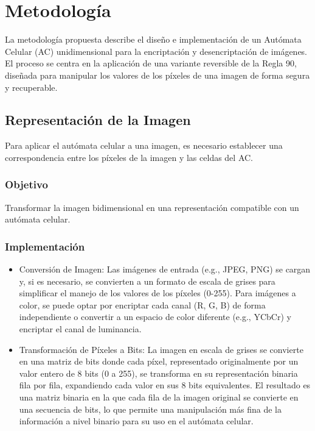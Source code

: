 \chapter{Metodología}
La metodología propuesta describe el diseño e implementación de un Autómata Celular (AC) unidimensional para la encriptación y desencriptación de imágenes. El proceso se centra en la aplicación de una variante reversible de la Regla 90, diseñada para manipular los valores de los píxeles de una imagen de forma segura y recuperable.

\section{Representación de la Imagen}
Para aplicar el autómata celular a una imagen, es necesario establecer una correspondencia entre los píxeles de la imagen y las celdas del AC.

\subsection{Objetivo}
Transformar la imagen bidimensional en una representación compatible con un autómata celular.

\subsection{Implementación}
\begin{itemize}
\item Conversión de Imagen: Las imágenes de entrada (e.g., JPEG, PNG) se cargan y, si es necesario, se convierten a un formato de escala de grises para simplificar el manejo de los valores de los píxeles (0-255). Para imágenes a color, se puede optar por encriptar cada canal (R, G, B) de forma independiente o convertir a un espacio de color diferente (e.g., YCbCr) y encriptar el canal de luminancia.
\item Transformación de Píxeles a Bits: La imagen en escala de grises se convierte en una matriz de bits donde cada píxel, representado originalmente por un valor entero de 8 bits (0 a 255), se transforma en su representación binaria fila por fila, expandiendo cada valor en sus 8 bits equivalentes. El resultado es una matriz binaria en la que cada fila de la imagen original se convierte en una secuencia de bits, lo que permite una manipulación más fina de la información a nivel binario para su uso en el autómata celular.
\end{itemize}


